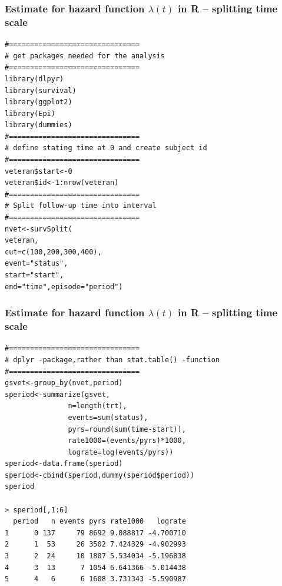 \documentclass[12pt]{beamer}
\begin{document}
\begin{frame}[fragile]
\frametitle{Estimate for hazard function $\lambda(t)$ in R \newline -- splitting time scale}

{\scriptsize 
\begin{verbatim}
#===============================
# get packages needed for the analysis
#===============================
library(dlpyr)
library(survival)
library(ggplot2)
library(Epi)
library(dummies)
#===============================
# define stating time at 0 and create subject id
#===============================
veteran$start<-0
veteran$id<-1:nrow(veteran)
#===============================
# Split follow-up time into interval
#===============================
nvet<-survSplit(
veteran,
cut=c(100,200,300,400),
event="status",
start="start",
end="time",episode="period")
\end{verbatim}
}
\end{frame}

\begin{frame}[fragile]
\frametitle{Estimate for hazard function $\lambda(t)$ in R \newline
 -- splitting time scale}
{\scriptsize \begin{verbatim}
#===============================
# dplyr -package,rather than stat.table() -function 
#===============================
gsvet<-group_by(nvet,period)
speriod<-summarize(gsvet, 
               n=length(trt),
               events=sum(status),
               pyrs=round(sum(time-start)),
               rate1000=(events/pyrs)*1000,
               lograte=log(events/pyrs))
speriod<-data.frame(speriod)
speriod<-cbind(speriod,dummy(speriod$period))
speriod

> speriod[,1:6]
  period   n events pyrs rate1000   lograte
1      0 137     79 8692 9.088817 -4.700710
2      1  53     26 3502 7.424329 -4.902993
3      2  24     10 1807 5.534034 -5.196838
4      3  13      7 1054 6.641366 -5.014438
5      4   6      6 1608 3.731343 -5.590987
\end{verbatim}
}
\end{frame}
\end{document}
